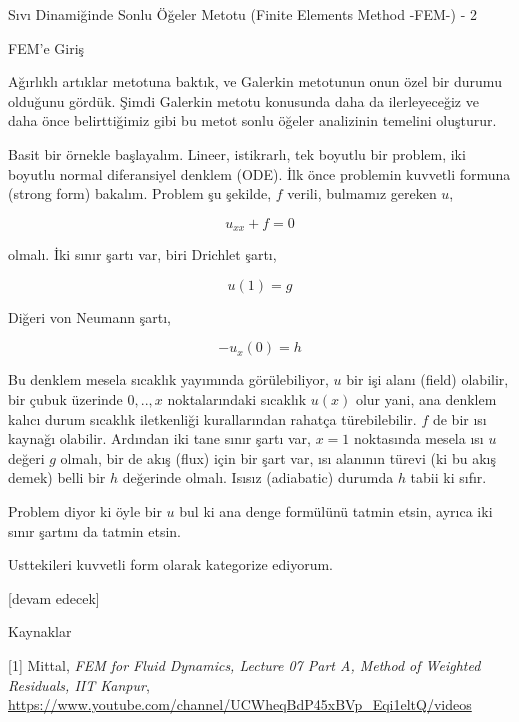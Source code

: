 \documentclass[12pt,fleqn]{article}\usepackage{../../common}
\begin{document}
Sıvı Dinamiğinde Sonlu Öğeler Metotu (Finite Elements Method -FEM-) - 2

FEM'e Giriş

Ağırlıklı artıklar metotuna baktık, ve Galerkin metotunun onun özel bir durumu
olduğunu gördük. Şimdi Galerkin metotu konusunda daha da ilerleyeceğiz ve daha
önce belirttiğimiz gibi bu metot sonlu öğeler analizinin temelini oluşturur.

Basit bir örnekle başlayalım. Lineer, istikrarlı, tek boyutlu bir problem, iki
boyutlu normal diferansiyel denklem (ODE). İlk önce problemin kuvvetli formuna
(strong form) bakalım. Problem şu şekilde, $f$ verili, bulmamız gereken $u$,

$$
u_{xx} + f = 0
$$

olmalı. İki sınır şartı var, biri Drichlet şartı,

$$
u(1) = g
$$

Diğeri von Neumann şartı,

$$
-u_{x}(0) = h
$$

Bu denklem mesela sıcaklık yayımında görülebiliyor, $u$ bir işi alanı (field)
olabilir, bir çubuk üzerinde $0,..,x$ noktalarındaki sıcaklık $u(x)$ olur yani,
ana denklem kalıcı durum sıcaklık iletkenliği kurallarından rahatça
türebilebilir. $f$ de bir ısı kaynağı olabilir. Ardından iki tane sınır şartı
var, $x=1$ noktasında mesela ısı $u$ değeri $g$ olmalı, bir de akış (flux) için
bir şart var, ısı alanının türevi (ki bu akış demek) belli bir $h$ değerinde
olmalı. Isısız (adiabatic) durumda $h$ tabii ki sıfır.

Problem diyor ki öyle bir $u$ bul ki ana denge formülünü tatmin etsin,
ayrıca iki sınır şartını da tatmin etsin.

Usttekileri kuvvetli form olarak kategorize ediyorum. 

[devam edecek]

Kaynaklar

[1] Mittal, {\em FEM for Fluid Dynamics, Lecture 07 Part A, Method of Weighted Residuals, IIT Kanpur},
    \url{https://www.youtube.com/channel/UCWheqBdP45xBVp_Eqi1eltQ/videos}
\end{document}
